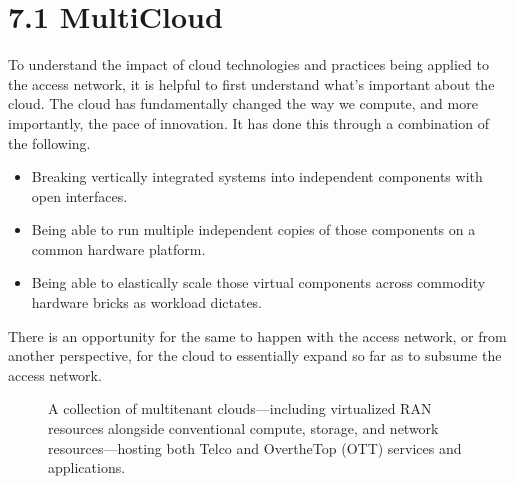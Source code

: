 \documentclass[a4paper,11pt,english]{sphinxmanual}
\let\sphinxpxdimen\pdfpxdimen\else\newdimen\sphinxpxdimen
\begin{document}
\section{7.1 Multi\sphinxhyphen{}Cloud}
\label{\detokenize{cloud:multi-cloud}}
\sphinxAtStartPar
To understand the impact of cloud technologies and practices being
applied to the access network, it is helpful to first understand what’s
important about the cloud. The cloud has fundamentally changed the way
we compute, and more importantly, the pace of innovation. It has done
this through a combination of the following.
\begin{itemize}
\item {} 
\sphinxAtStartPar
{} Breaking vertically integrated systems into
independent components with open interfaces.

\item {} 
\sphinxAtStartPar
{} Being able to run multiple independent copies of
those components on a common hardware platform.

\item {} 
\sphinxAtStartPar
{} Being able to elastically scale those virtual
components across commodity hardware bricks as workload dictates.

\end{itemize}

\sphinxAtStartPar
There is an opportunity for the same to happen with the access network,
or from another perspective, for the cloud to essentially expand so far
as to subsume the access network.

\begin{figure}[ht]
\centering
\capstart

\noindent\sphinxincludegraphics[width=700\sphinxpxdimen]{{Slide32}.png}
\caption{A collection of multi\sphinxhyphen{}tenant clouds—including virtualized RAN
resources alongside conventional compute, storage, and network
resources—hosting both Telco and Over\sphinxhyphen{}the\sphinxhyphen{}Top (OTT) services and
applications.}\label{\detokenize{cloud:id1}}\label{\detokenize{cloud:fig-cloud}}\end{figure}
\end{document}
